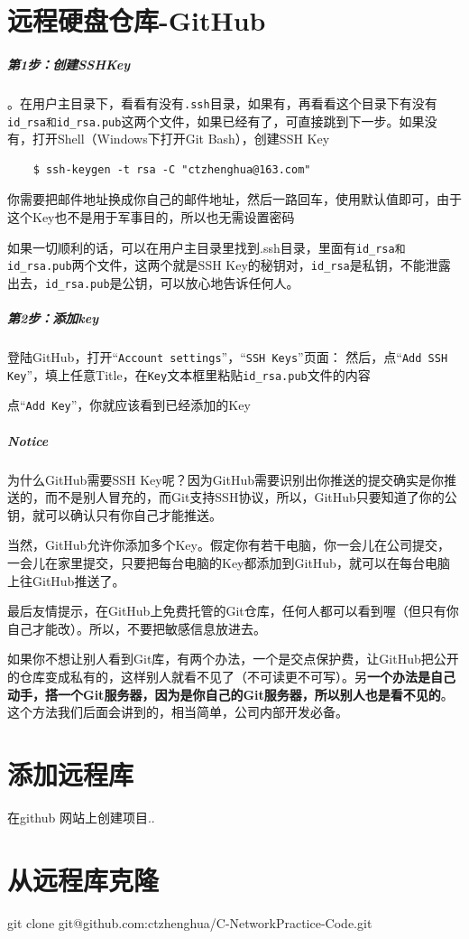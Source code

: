 \documentclass[UTF8,a4paper,12pt]{ctexbook}
\begin{document}
	  \section{远程硬盘仓库-GitHub}
		  \subparagraph{第1步：创建SSHKey}。在用户主目录下，看看有没有\verb|.ssh|目录，如果有，再看看这个目录下有没有\verb|id_rsa和id_rsa.pub|这两个文件，如果已经有了，可直接跳到下一步。如果没有，打开Shell（Windows下打开Git Bash），创建SSH Key
		  
		  \begin{lstlisting}
	$ ssh-keygen -t rsa -C "ctzhenghua@163.com"
		  \end{lstlisting}
		  
		  你需要把邮件地址换成你自己的邮件地址，然后一路回车，使用默认值即可，由于这个Key也不是用于军事目的，所以也无需设置密码
		  
		  如果一切顺利的话，可以在用户主目录里找到.ssh目录，里面有\verb|id_rsa和id_rsa.pub|两个文件，这两个就是SSH Key的秘钥对，\verb|id_rsa|是私钥，不能泄露出去，\verb|id_rsa.pub|是公钥，可以放心地告诉任何人。
		  
		  \subparagraph{第2步：添加key}登陆GitHub，打开“\verb|Account settings|”，“\verb|SSH Keys|”页面：
		  然后，点“\verb|Add SSH Key|”，填上任意Title，在\verb|Key|文本框里粘贴\verb|id_rsa.pub|文件的内容
		  
		  点“\verb|Add Key|”，你就应该看到已经添加的Key
		  
		  \subparagraph{Notice}
			  为什么GitHub需要SSH Key呢？因为GitHub需要识别出你推送的提交确实是你推送的，而不是别人冒充的，而Git支持SSH协议，所以，GitHub只要知道了你的公钥，就可以确认只有你自己才能推送。
			  
			  当然，GitHub允许你添加多个Key。假定你有若干电脑，你一会儿在公司提交，一会儿在家里提交，只要把每台电脑的Key都添加到GitHub，就可以在每台电脑上往GitHub推送了。
			  
			  最后友情提示，在GitHub上免费托管的Git仓库，任何人都可以看到喔（但只有你自己才能改）。所以，不要把敏感信息放进去。
			  
			  如果你不想让别人看到Git库，有两个办法，一个是交点保护费，让GitHub把公开的仓库变成私有的，这样别人就看不见了（不可读更不可写）。另\textbf{一个办法是自己动手，搭一个Git服务器，因为是你自己的Git服务器，所以别人也是看不见的}。这个方法我们后面会讲到的，相当简单，公司内部开发必备。
	  \section{添加远程库}
		  在github 网站上创建项目..
	  \section{从远程库克隆}
		  git clone git@github.com:ctzhenghua/C-NetworkPractice-Code.git
		  
\end{document}
